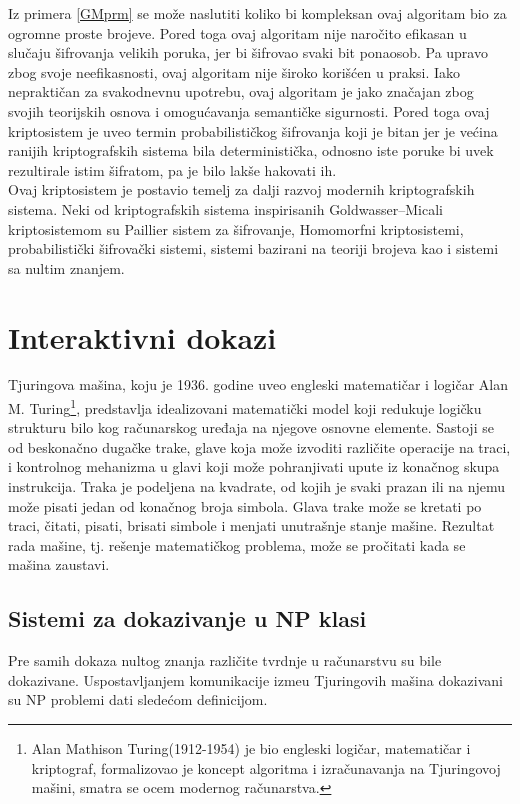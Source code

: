 Iz primera \ref{GMprm} se može naslutiti koliko bi kompleksan ovaj algoritam bio za ogromne proste brojeve. Pored toga ovaj algoritam nije naročito efikasan u slučaju šifrovanja velikih poruka, jer bi šifrovao svaki bit ponaosob. Pa upravo zbog svoje neefikasnosti, ovaj algoritam nije široko korišćen u praksi. Iako nepraktičan za svakodnevnu upotrebu, ovaj algoritam je jako značajan zbog svojih teorijskih osnova i omogućavanja semantičke sigurnosti. Pored toga ovaj kriptosistem je uveo termin probabilističkog šifrovanja koji je bitan jer je većina ranijih kriptografskih sistema bila deterministička, odnosno iste poruke bi uvek rezultirale istim šifratom, pa je bilo lakše hakovati ih.\\
Ovaj kriptosistem je postavio temelj za dalji razvoj modernih kriptografskih sistema. Neki od kriptografskih sistema inspirisanih \textenglish{Goldwasser–Micali} kriptosistemom su \textenglish{Paillier} sistem za šifrovanje, Homomorfni kriptosistemi, probabilistički šifrovački sistemi, sistemi bazirani na teoriji brojeva kao i sistemi sa nultim znanjem.

\chapter{Interaktivni dokazi}

Tjuringova mašina, koju je 1936. godine uveo engleski matematičar i logičar \textenglish{Alan M. Turing}\footnote{\textenglish{Alan Mathison Turing}(1912-1954) je bio engleski logičar, matematičar i kriptograf, formalizovao je koncept algoritma i izračunavanja na Tjuringovoj mašini, smatra se ocem modernog računarstva\cite{BeaversManuscript-BEAATM}.}, predstavlja idealizovani matematički model koji redukuje logičku strukturu bilo kog računarskog uređaja na njegove osnovne elemente. Sastoji se od beskonačno duga\v cke trake, glave koja može izvoditi različite operacije na traci, i kontrolnog mehanizma u glavi koji može pohranjivati upute iz konačnog skupa instrukcija. Traka je podeljena na kvadrate, od kojih je svaki prazan ili na njemu mo\v ze pisati jedan od konačnog broja simbola. Glava trake može se kretati po traci, čitati, pisati, brisati simbole i menjati unutrašnje stanje mašine. Rezultat rada mašine, tj. rešenje matematičkog problema, može se pročitati kada se mašina zaustavi.

\section{Sistemi za dokazivanje u \textenglish{\textenglish{NP} } klasi}
Pre samih dokaza nultog znanja razli\v cite tvrdnje u ra\v cunarstvu su bile dokazivane. Uspostavljanjem komunikacije izme\dj u Tjuringovih ma\v sina dokazivani su \textenglish{NP}  problemi dati slede\' com definicijom.


